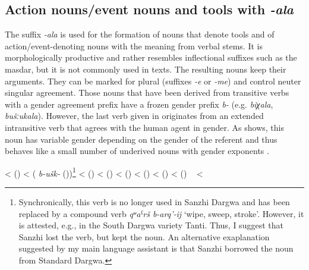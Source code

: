 \subsection{Action nouns\slash event nouns and tools with \textit{-ala}}
\label{ssec:Action and event nouns way of V-ing with -ala}

The suffix \textit{-ala} is used for the formation of nouns that denote tools and of action/event-denoting nouns with the meaning  from verbal stems. It is morphologically productive and rather resembles inflectional suffixes such as the masdar, but it is not commonly used in texts. The resulting nouns keep their arguments. They can be marked for plural (suffixes \textit{-e} or \textit{-me}) and control neuter singular agreement. Those nouns that have been derived from transitive verbs with a gender agreement prefix have a frozen gender prefix \textit{b- }(e.g. \textit{biχala}, \textit{bušːukala}). However, the last verb given in  originates from an extended intransitive verb that agrees with the human agent in gender. As  shows, this noun has variable gender depending on the gender of the referent and thus behaves like a small number of underived  nouns with gender exponents .
%



\begin{exe}
	\ex	\label{irʁ-ala understanding}
	\begin{xlist}
		\TabPositions{12em,14em}
		\ex	{} 		\tab	<	\tab	{}  ()
		\ex	{} 		\tab	<	\tab  (\textit{ b-ušk-}	 ())\footnote{Synchronically, this verb is no longer used in Sanzhi Dargwa and has been replaced by a compound verb \textit{qʷaˁrš b-arq'-ij} `wipe, sweep, stroke'. However, it is attested, e.g., in the South Dargwa variety Tanti. Thus, I suggest that Sanzhi lost the verb, but kept the noun. An alternative exaplanation suggested by my main language assistant is that Sanzhi borrowed the noun from Standard Dargwa.}
		\ex	{} 		\tab	<	\tab	{}  ()
		\ex	{} 		\tab	<	\tab	{}  ()
		\ex	{} 		\tab	<	\tab	{}  ()
		\ex	{} 		\tab	<	\tab	{}  ()
		\ex	{} 	\tab	<	\tab	{}  ()
		\ex	{} 		\tab	<	\tab	{}  ()
		\ex	{} 
		\sn	~\hspace*{1em}				\tab	<	\tab	{} 
	\end{xlist}
\end{exe}

